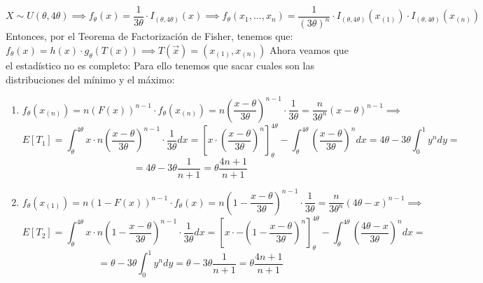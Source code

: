 \begin{sol}
	$$X \sim U(\theta, 4\theta) \implies f_{\theta}(x) = \frac{1}{3\theta} \cdot I_{(\theta, 4\theta)}(x) \implies f_{\theta}(x_1, \ldots, x_n) = \frac{1}{(3\theta)^n} \cdot I_{(\theta, 4\theta)}(x_{(1)}) \cdot I_{(\theta, 4\theta)}(x_{(n)})$$
	Entonces, por el Teorema de Factorización de Fisher, tenemos que: $f_{\theta}(x) = h(x) \cdot g_{\theta}(T(x)) \implies T(\vec{x}) = (x_{(1)}, x_{(n)})$ 
	Ahora veamos que el estadístico no es completo: 
	Para ello tenemos que sacar cuales son las distribuciones del mínimo y el máximo:
	\begin{enumerate}
		\item $$f_{\theta}(x_{(n)}) = n(F(x))^{n-1} \cdot f_{\theta}(x_{(n)}) = n\left(\frac{x - \theta}{3\theta}\right)^{n-1} \cdot \frac{1}{3\theta} = \frac{n}{3\theta^n}(x - \theta)^{n-1} \implies$$
		$$E[T_1] = \int_{\theta}^{4\theta}x \cdot n\left(\frac{x - \theta}{3\theta}\right)^{n-1} \cdot \frac{1}{3\theta}dx = \left[x\cdot \left(\frac{x - \theta}{3\theta}\right)^n\right]_{\theta}^{4\theta} - \int_{\theta}^{4\theta} \left(\frac{x - \theta}{3\theta}\right)^n dx = 4\theta - 3\theta\int_{0}^{1}y^n dy = $$ $$ = 4\theta - 3\theta\frac{1}{n+1} = \theta\frac{4n + 1}{n+1}$$
		\item $$f_{\theta}(x_{(1)}) = n(1 - F(x))^{n-1} \cdot f_{\theta}(x) = n\left(1 - \frac{x - \theta}{3\theta}\right)^{n-1} \cdot \frac{1}{3\theta} = \frac{n}{3\theta^n}(4\theta - x)^{n-1} \implies$$
		$$E[T_2] = \int_{\theta}^{4\theta} x \cdot n\left(1 - \frac{x - \theta}{3\theta}\right)^{n-1} \cdot \frac{1}{3\theta}dx = \left[x\cdot -\left(1 - \frac{x - \theta}{3\theta}\right)^n\right]_{\theta}^{4\theta} - \int_{\theta}^{4\theta} \left(\frac{4\theta - x}{3\theta}\right)^n dx = $$ $$ = \theta - 3\theta\int_{0}^{1}y^n dy = \theta - 3\theta\frac{1}{n+1} = \theta\frac{4n + 1}{n+1}$$
	\end{enumerate} 
\end{sol}

